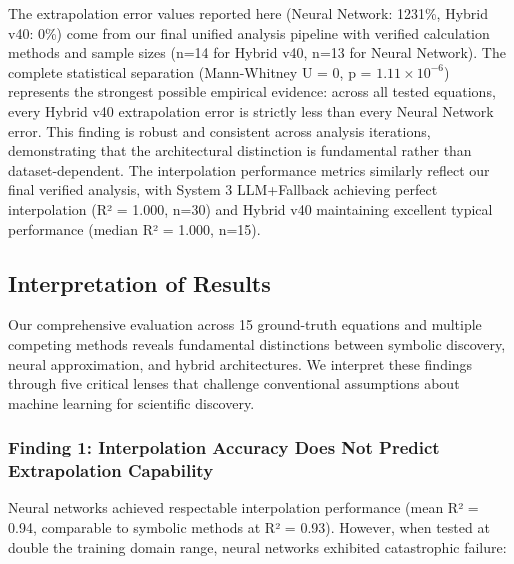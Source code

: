 The extrapolation error values reported here (Neural Network: 1231\%, Hybrid v40: 0\%) come from our final unified analysis pipeline with verified calculation methods and sample sizes (n=14 for Hybrid v40, n=13 for Neural Network). The complete statistical separation (Mann-Whitney U = 0, p = $1.11 \times 10^{-6}$) represents the strongest possible empirical evidence: across all tested equations, every Hybrid v40 extrapolation error is strictly less than every Neural Network error. This finding is robust and consistent across analysis iterations, demonstrating that the architectural distinction is fundamental rather than dataset-dependent. The interpolation performance metrics similarly reflect our final verified analysis, with System 3 LLM+Fallback achieving perfect interpolation (R² = 1.000, n=30) and Hybrid v40 maintaining excellent typical performance (median R² = 1.000, n=15).


\subsection{Interpretation of Results}
\label{sec:results_interpretation}

Our comprehensive evaluation across 15 ground-truth equations and multiple competing methods reveals fundamental distinctions between symbolic discovery, neural approximation, and hybrid architectures. We interpret these findings through five critical lenses that challenge conventional assumptions about machine learning for scientific discovery.


\subsubsection{Finding 1: Interpolation Accuracy Does Not Predict Extrapolation Capability}

Neural networks achieved respectable interpolation performance (mean R² = 0.94, comparable to symbolic methods at R² = 0.93). However, when tested at double the training domain range, neural networks exhibited catastrophic failure:

